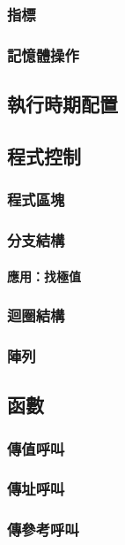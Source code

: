 \documentclass[12pt,a4paper,oneside]{article}
\begin{document}
\begin{CJK}{UTF8}{bkai}
\subsubsection{指標}

\subsubsection{記憶體操作}

\subsection{執行時期配置}

\subsection{程式控制}

\subsubsection{程式區塊}

\subsubsection{分支結構}

\paragraph{應用：找極值}

\subsubsection{迴圈結構}
\subsubsection{陣列}

\subsection{函數}
\subsubsection{傳值呼叫}
\subsubsection{傳址呼叫}
\subsubsection{傳參考呼叫}

\end{CJK}
\end{document}
